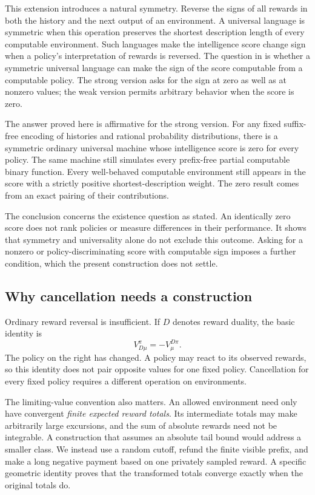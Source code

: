 \documentclass[11pt]{article}
\theoremstyle{definition}
\theoremstyle{remark}
\begin{document}
This extension introduces a natural symmetry.  Reverse the signs of all
rewards in both the history and the next output of an environment.  A
universal language is symmetric when this operation preserves the
shortest description length of every computable environment.  Such
languages make the intelligence score change sign when a policy's
interpretation of rewards is reversed.  The question in
\cite[Section~5]{AlexanderHutter2021} is whether a symmetric universal
language can make the sign of the score computable from a computable
policy.  The strong version asks for the sign at zero as well as at
nonzero values; the weak version permits arbitrary behavior when the
score is zero.

The answer proved here is affirmative for the strong version.  For any
fixed suffix-free encoding of histories and rational probability
distributions, there is a symmetric ordinary universal machine whose
intelligence score is zero for every policy.  The same machine still
simulates every prefix-free partial computable binary function.  Every
well-behaved computable environment still appears in the score with a
strictly positive shortest-description weight.  The zero result comes
from an exact pairing of their contributions.

The conclusion concerns the existence question as stated.  An identically
zero score does not rank policies or measure differences in their
performance.  It shows that symmetry and universality alone do not
exclude this outcome.  Asking for a nonzero or policy-discriminating
score with computable sign imposes a further condition, which the present
construction does not settle.

\subsection*{Why cancellation needs a construction}

Ordinary reward reversal is insufficient.  If $D$ denotes reward duality,
the basic identity is
\[
  V_{D\mu}^{\pi}=-V_{\mu}^{D\pi}.
\]
The policy on the right has changed.  A policy may react to its observed
rewards, so this identity does not pair opposite values for one fixed
policy.  Cancellation for every fixed policy requires a different
operation on environments.

The limiting-value convention also matters.  An allowed environment
need only have convergent \emph{finite expected reward totals}.  Its
intermediate totals may make arbitrarily large excursions, and the sum
of absolute rewards need not be integrable.  A construction that assumes
an absolute tail bound would address a smaller class.  We instead use
a random cutoff, refund the finite visible prefix, and make a long
negative payment based on one privately sampled reward.  A specific
geometric identity proves that the transformed totals converge exactly
when the original totals do.
\end{document}
